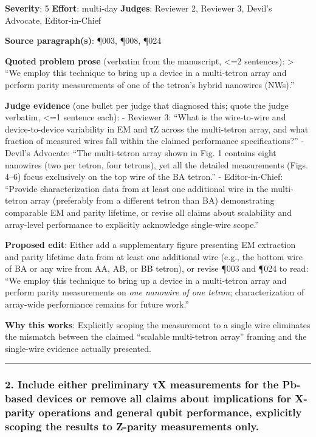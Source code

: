 \documentclass[10pt,letterpaper]{article}
\begin{document}
\textbf{Severity}: 5 \textbf{Effort}: multi-day \textbf{Judges}: Reviewer 2, Reviewer 3, Devil's Advocate, Editor-in-Chief

\textbf{Source paragraph(s)}: ¶003, ¶008, ¶024

\textbf{Quoted problem prose} (verbatim from the manuscript, \textless=2 sentences):
\textgreater{} ``We employ this technique to bring up a device in a multi-tetron array and perform parity measurements of one of the tetron's hybrid nanowires (NWs).''

\textbf{Judge evidence} (one bullet per judge that diagnosed this; quote the judge verbatim, \textless=1 sentence each):
- Reviewer 3: ``What is the wire-to-wire and device-to-device variability in EM and τZ across the multi-tetron array, and what fraction of measured wires fall within the claimed performance specifications?''
- Devil's Advocate: ``The multi-tetron array shown in Fig. 1 contains eight nanowires (two per tetron, four tetrons), yet all the detailed measurements (Figs. 4--6) focus exclusively on the top wire of the BA tetron.''
- Editor-in-Chief: ``Provide characterization data from at least one additional wire in the multi-tetron array (preferably from a different tetron than BA) demonstrating comparable EM and parity lifetime, or revise all claims about scalability and array-level performance to explicitly acknowledge single-wire scope.''

\textbf{Proposed edit}: Either add a supplementary figure presenting EM extraction and parity lifetime data from at least one additional wire (e.g., the bottom wire of BA or any wire from AA, AB, or BB tetron), or revise ¶003 and ¶024 to read: ``We employ this technique to bring up a device in a multi-tetron array and perform parity measurements on \emph{one nanowire of one tetron}; characterization of array-wide performance remains for future work.''

\textbf{Why this works}: Explicitly scoping the measurement to a single wire eliminates the mismatch between the claimed ``scalable multi-tetron array'' framing and the single-wire evidence actually presented.

\begin{center}\rule{0.5\linewidth}{0.5pt}\end{center}

\hypertarget{include-either-preliminary-ux3c4x-measurements-for-the-pb-based-devices-or-remove-all-claims-about-implications-for-x-parity-operations-and-general-qubit-performance-explicitly-scoping-the-results-to-z-parity-measurements-only.}{%
\subsubsection{2. Include either preliminary τX measurements for the Pb-based devices or remove all claims about implications for X-parity operations and general qubit performance, explicitly scoping the results to Z-parity measurements only.}\label{include-either-preliminary-ux3c4x-measurements-for-the-pb-based-devices-or-remove-all-claims-about-implications-for-x-parity-operations-and-general-qubit-performance-explicitly-scoping-the-results-to-z-parity-measurements-only.}}
\end{document}

